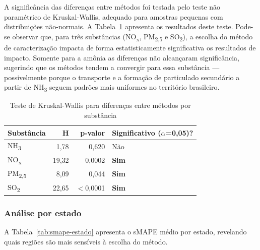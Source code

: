 A signific\^ancia das diferen\c{c}as entre m\'etodos foi testada pelo teste n\~ao param\'etrico de Kruskal-Wallis, adequado para amostras pequenas com distribui\c{c}\~oes n\~ao-normais. A Tabela~\ref{tab:kruskal} apresenta os resultados deste teste. Pode-se observar que, para três substâncias (NO\textsubscript{x}, PM\textsubscript{2,5} e SO\textsubscript{2}), a escolha do m\'etodo de caracteriza\c{c}\~ao impacta de forma estatisticamente significativa os resultados de impacto. Somente para a am\^onia as diferen\c{c}as n\~ao alcan\c{c}aram signific\^ancia, sugerindo que os m\'etodos tendem a convergir para essa subst\^ancia --- possivelmente porque o transporte e a forma\c{c}\~ao de particulado secund\'ario a partir de NH\textsubscript{3} seguem padr\~oes mais uniformes no territ\'orio brasileiro.

\begin{table}[H]
\centering
\caption{Teste de Kruskal-Wallis para diferen\c{c}as entre m\'etodos por subst\^ancia}
\label{tab:kruskal}
\begin{tabular}{lrrl}
\toprule
\textbf{Subst\^ancia} & \textbf{H} & \textbf{p-valor} & \textbf{Significativo ($\alpha$=0,05)?} \\
\midrule
NH\textsubscript{3}    &  1,78 & 0,620   & N\~ao \\
NO\textsubscript{x}    & 19,32 & 0,0002  & \textbf{Sim} \\
PM\textsubscript{2,5}  &  8,09 & 0,044   & \textbf{Sim} \\
SO\textsubscript{2}    & 22,65 & $<$0,0001 & \textbf{Sim} \\
\bottomrule
\end{tabular}
\end{table}


\subsubsection{An\'alise por estado}

A Tabela~\ref{tab:smape-estado} apresenta o sMAPE m\'edio por estado, revelando quais regi\~oes s\~ao mais sens\'iveis \`a escolha do m\'etodo.

